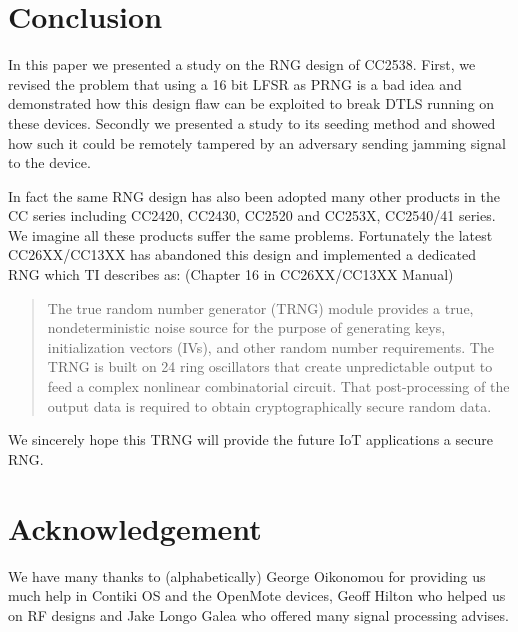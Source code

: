 \section{Conclusion}
In this paper we presented a study on the RNG design of CC2538. First, we revised the problem that using a 16 bit LFSR as PRNG is a bad idea and demonstrated how this design flaw can be exploited to break DTLS running on these devices. Secondly we presented a study to its seeding method and showed how such it could be remotely tampered by an adversary sending jamming signal to the device.

In fact the same RNG design has also been adopted many other products in the CC series including CC2420\cite{CC2420Manual}, CC2430\cite{CC2430Manual}, CC2520\cite{CC2520Manual} and CC253X, CC2540/41 series\cite{CC2530Manual}. We imagine all these products suffer the same problems. Fortunately the latest CC26XX/CC13XX\cite{CC26XXManual} has abandoned this design and implemented a dedicated RNG which TI describes as: (Chapter 16 in CC26XX/CC13XX Manual\cite{CC26XXManual})
\begin{quote}
The true random number generator (TRNG) module provides a true, nondeterministic noise source for the
purpose of generating keys, initialization vectors (IVs), and other random number requirements. The
TRNG is built on 24 ring oscillators that create unpredictable output to feed a complex nonlinear
combinatorial circuit. That post-processing of the output data is required to obtain cryptographically secure
random data.
\end{quote}

We sincerely hope this TRNG will provide the future IoT applications a secure RNG.

\section{Acknowledgement}
We have many thanks to (alphabetically) George Oikonomou for providing us much help in Contiki OS and the OpenMote devices, Geoff Hilton who helped us on RF designs and Jake Longo Galea who offered many signal processing advises.